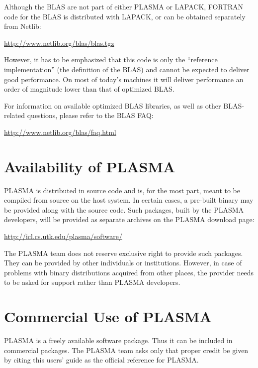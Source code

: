 Although the BLAS are not part of either PLASMA or LAPACK, FORTRAN code for the
BLAS is distributed with LAPACK, or can be obtained separately from Netlib:
\begin{link_url}
\url{http://www.netlib.org/blas/blas.tgz}
\end{link_url}
However, it has to be emphasized that this code is only the ``reference implementation'' (the definition
of the BLAS) and cannot be expected to deliver good performance. On most of today's machines it will
deliver performance an order of magnitude lower than that of optimized BLAS.

For information on available optimized BLAS libraries, as well as other \mbox{BLAS-related} questions,
please refer to the BLAS FAQ:
\begin{link_url}
\url{http://www.netlib.org/blas/faq.html}
\end{link_url}


\section{Availability of PLASMA}

PLASMA is distributed in source code and is, for the most part, meant to be compiled from source
on the host system.
In certain cases, a \mbox{pre-built} binary may be provided along with the source code.
Such packages, built by the PLASMA developers, will be provided as separate archives on the
PLASMA download page:
\begin{link_url}
\url{http://icl.cs.utk.edu/plasma/software/}
\end{link_url}
The PLASMA team does not reserve exclusive right to provide such packages. They can be provided
by other individuals or institutions.
However, in case of problems with binary distributions acquired from other places, the provider
needs to be asked for support rather than PLASMA developers.


\section{Commercial Use of PLASMA}

PLASMA is a freely available software package.
Thus it can be included in commercial packages.
The PLASMA team asks only that proper credit be given by citing this users' guide as the official
reference for PLASMA.


